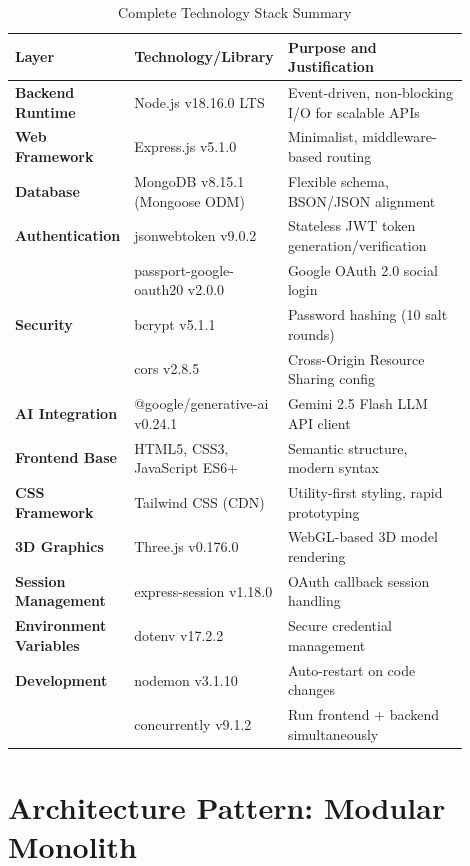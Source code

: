 \begin{table}[H]
\centering
\caption{Complete Technology Stack Summary}
\label{tab:tech_stack_summary}
\small
\begin{tabular}{@{}p{0.20\linewidth}p{0.30\linewidth}p{0.40\linewidth}@{}}
\toprule
\textbf{Layer} & \textbf{Technology/Library} & \textbf{Purpose and Justification} \\
\midrule
\textbf{Backend Runtime} & Node.js v18.16.0 LTS & Event-driven, non-blocking I/O for scalable APIs \\
\textbf{Web Framework} & Express.js v5.1.0 & Minimalist, middleware-based routing \\
\textbf{Database} & MongoDB v8.15.1 (Mongoose ODM) & Flexible schema, BSON/JSON alignment \\
\textbf{Authentication} & jsonwebtoken v9.0.2 & Stateless JWT token generation/verification \\
 & passport-google-oauth20 v2.0.0 & Google OAuth 2.0 social login \\
\textbf{Security} & bcrypt v5.1.1 & Password hashing (10 salt rounds) \\
 & cors v2.8.5 & Cross-Origin Resource Sharing config \\
\textbf{AI Integration} & @google/generative-ai v0.24.1 & Gemini 2.5 Flash LLM API client \\
\textbf{Frontend Base} & HTML5, CSS3, JavaScript ES6+ & Semantic structure, modern syntax \\
\textbf{CSS Framework} & Tailwind CSS (CDN) & Utility-first styling, rapid prototyping \\
\textbf{3D Graphics} & Three.js v0.176.0 & WebGL-based 3D model rendering \\
\textbf{Session Management} & express-session v1.18.0 & OAuth callback session handling \\
\textbf{Environment Variables} & dotenv v17.2.2 & Secure credential management \\
\textbf{Development} & nodemon v3.1.10 & Auto-restart on code changes \\
 & concurrently v9.1.2 & Run frontend + backend simultaneously \\
\bottomrule
\end{tabular}
\end{table}

\section{Architecture Pattern: Modular Monolith}

